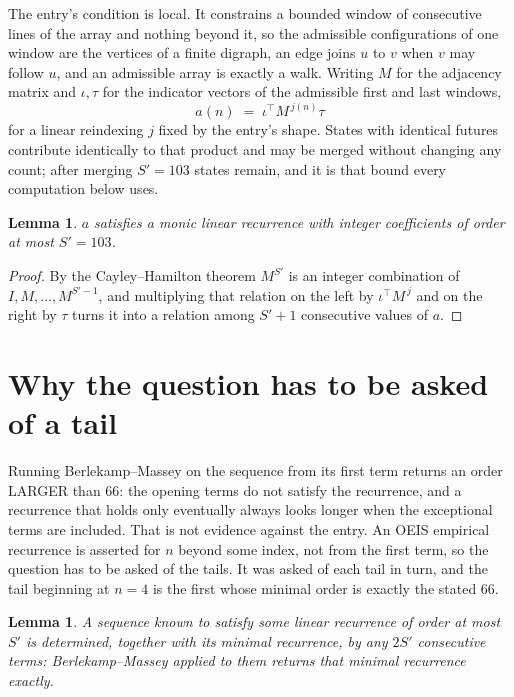 \documentclass[11pt,a4paper]{article}
\theoremstyle{plain}
\newtheorem{lemma}[theorem]{Lemma}
\theoremstyle{definition}
\begin{document}
The entry's condition is local. It constrains a bounded window of consecutive lines of the
array and nothing beyond it, so the admissible configurations of one window are the vertices of
a finite digraph, an edge joins $u$ to $v$ when $v$ may follow $u$, and an admissible array is
exactly a walk. Writing $M$ for the adjacency matrix and $\iota,\tau$ for the indicator vectors
of the admissible first and last windows,
\[
a(n)\;=\;\iota^{\!\top}M^{\,j(n)}\tau
\]
for a linear reindexing $j$ fixed by the entry's shape. States with identical futures
contribute identically to that product and may be merged without changing any count; after
merging $S'=103$ states remain, and it is that bound every computation below uses.

\begin{lemma}\label{lem:cf}
$a$ satisfies a monic linear recurrence with integer coefficients of order at most $S'=103$.
\end{lemma}

\begin{proof}
By the Cayley--Hamilton theorem $M^{S'}$ is an integer combination of $I,M,\dots,M^{S'-1}$,
and multiplying that relation on the left by $\iota^{\!\top}M^{\,j}$ and on the right by
$\tau$ turns it into a relation among $S'+1$ consecutive values of $a$.
\end{proof}

\section{Why the question has to be asked of a tail}

Running Berlekamp--Massey on the sequence from its first term returns an order LARGER than $66$: the opening terms do not satisfy the recurrence, and a recurrence that holds only eventually always looks longer when the exceptional terms are included. That is not evidence against the entry. An OEIS empirical recurrence is asserted for $n$ beyond some index, not from the first term, so the question has to be asked of the tails. It was asked of each tail in turn, and the tail beginning at $n=4$ is the first whose minimal order is exactly the stated $66$.

\begin{lemma}\label{lem:bm}
A sequence known to satisfy some linear recurrence of order at most $S'$ is determined,
together with its minimal recurrence, by any $2S'$ consecutive terms: Berlekamp--Massey applied
to them returns that minimal recurrence exactly.
\end{lemma}
\end{document}
